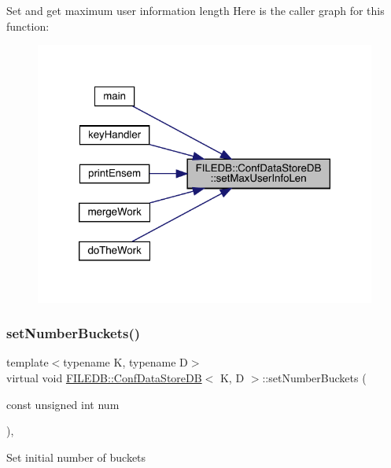 Set and get maximum user information length Here is the caller graph for this function\+:
\nopagebreak
\begin{figure}[H]
\begin{center}
\leavevmode
\includegraphics[width=320pt]{d8/d19/classFILEDB_1_1ConfDataStoreDB_a02a2fcc79ba97c11b4ec1ec0321e5415_icgraph}
\end{center}
\end{figure}
\mbox{\label{classFILEDB_1_1ConfDataStoreDB_a20a5d092cdcfbca4dbce15b2da006065}} 
\subsubsection{\texorpdfstring{setNumberBuckets()}{setNumberBuckets()}\hspace{0.1cm}{\footnotesize\ttfamily [1/3]}}
{\footnotesize\ttfamily template$<$typename K, typename D$>$ \\
virtual void \mbox{\hyperlink{classFILEDB_1_1ConfDataStoreDB}{F\+I\+L\+E\+D\+B\+::\+Conf\+Data\+Store\+DB}}$<$ K, D $>$\+::set\+Number\+Buckets (\begin{DoxyParamCaption}\item[{const unsigned int}]{num }\end{DoxyParamCaption})\hspace{0.3cm}{\ttfamily [inline]}, {\ttfamily [virtual]}}

Set initial number of buckets

